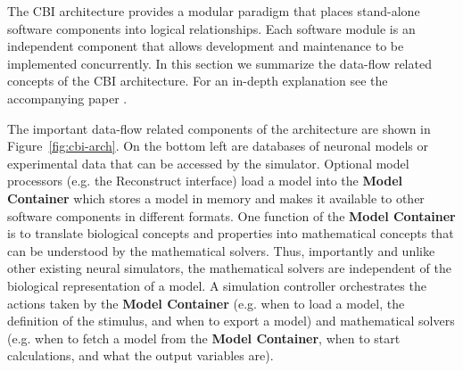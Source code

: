 \documentclass[10pt]{article}
\begin{document}
The CBI architecture provides a modular paradigm that places stand-alone
software components into logical relationships.  Each software module
is an independent component that allows development and
maintenance to be implemented concurrently.
In this section we summarize the data-flow related concepts of the CBI
architecture.  For an in-depth explanation see the accompanying paper
\cite{cornelis11b}.

The important data-flow related components of the architecture are
shown in Figure~\ref{fig:cbi-arch}. On the bottom left are
databases of neuronal models or experimental data that can be accessed
by the simulator. Optional model processors (e.g. the Reconstruct
interface) load a model into the {\bf Model Container} which stores a
model in memory and makes it available to other software components in
different formats.  One function of the {\bf Model Container} is to
translate biological concepts and properties into mathematical
concepts that can be understood by the mathematical solvers. Thus,
importantly and unlike other existing neural simulators, the
mathematical solvers are independent of the biological representation
of a model. A simulation controller orchestrates the actions taken by
the {\bf Model Container} (e.g. when to load a model, the definition
of the stimulus, and when to export a model) and mathematical solvers
(e.g. when to fetch a model from the {\bf Model Container}, when to
start
calculations, and what the output variables are).

\end{document}

